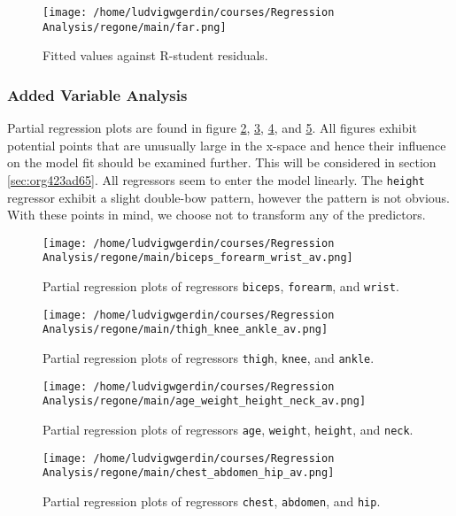 \documentclass[11pt]{article}
\begin{document}
\begin{figure}[htbp]
\centering
\texttt{[image: /home/ludvigwgerdin/courses/Regression Analysis/regone/main/far.png]}
\caption{\label{fig:org5a0dafc}
Fitted values against R-student residuals.}
\end{figure}

\subsubsection{Added Variable Analysis}
\label{sec:org540fbb7}

Partial regression plots are found in figure \ref{fig:org314bf82}, \ref{fig:org4d5b5aa},
\ref{fig:org76b3151}, and \ref{fig:org0daff32}. All figures exhibit potential points 
that are unusually large in the x-space and hence their influence on the model fit should be 
examined further. This will be considered in section \ref{sec:org423ad65}. All regressors
seem to enter the model linearly. The \texttt{height} regressor exhibit a slight double-bow pattern, however
the pattern is not obvious. With these points in mind, we choose not to transform any of the 
predictors.

\begin{figure}[htbp]
\centering
\texttt{[image: /home/ludvigwgerdin/courses/Regression Analysis/regone/main/biceps\_forearm\_wrist\_av.png]}
\caption{\label{fig:org314bf82}
Partial regression plots of regressors \texttt{biceps}, \texttt{forearm}, and \texttt{wrist}.}
\end{figure}   

\begin{figure}[htbp]
\centering
\texttt{[image: /home/ludvigwgerdin/courses/Regression Analysis/regone/main/thigh\_knee\_ankle\_av.png]}
\caption{\label{fig:org4d5b5aa}
Partial regression plots of regressors \texttt{thigh}, \texttt{knee}, and \texttt{ankle}.}
\end{figure}

\begin{figure}[htbp]
\centering
\texttt{[image: /home/ludvigwgerdin/courses/Regression Analysis/regone/main/age\_weight\_height\_neck\_av.png]}
\caption{\label{fig:org76b3151}
Partial regression plots of regressors \texttt{age}, \texttt{weight}, \texttt{height}, and \texttt{neck}.}
\end{figure}

\begin{figure}[htbp]
\centering
\texttt{[image: /home/ludvigwgerdin/courses/Regression Analysis/regone/main/chest\_abdomen\_hip\_av.png]}
\caption{\label{fig:org0daff32}
Partial regression plots of regressors \texttt{chest}, \texttt{abdomen}, and \texttt{hip}.}
\end{figure}
\end{document}
